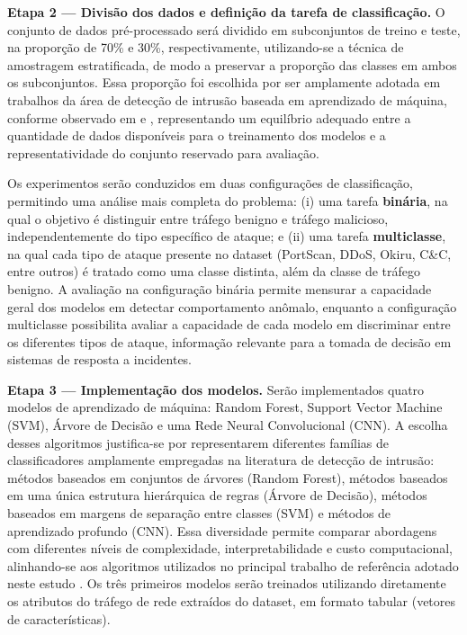 \textbf{Etapa 2 — Divisão dos dados e definição da tarefa de classificação.} O conjunto de dados pré-processado será dividido em subconjuntos de treino e teste, na proporção de 70\% e 30\%, respectivamente, utilizando-se a técnica de amostragem estratificada, de modo a preservar a proporção das classes em ambos os subconjuntos. Essa proporção foi escolhida por ser amplamente adotada em trabalhos da área de detecção de intrusão baseada em aprendizado de máquina, conforme observado em \cite{SouzaArima2024} e \cite{Bochie2020}, representando um equilíbrio adequado entre a quantidade de dados disponíveis para o treinamento dos modelos e a representatividade do conjunto reservado para avaliação.

Os experimentos serão conduzidos em duas configurações de classificação, permitindo uma análise mais completa do problema: (i) uma tarefa \textbf{binária}, na qual o objetivo é distinguir entre tráfego benigno e tráfego malicioso, independentemente do tipo específico de ataque; e (ii) uma tarefa \textbf{multiclasse}, na qual cada tipo de ataque presente no dataset (PortScan, DDoS, Okiru, C\&C, entre outros) é tratado como uma classe distinta, além da classe de tráfego benigno. A avaliação na configuração binária permite mensurar a capacidade geral dos modelos em detectar comportamento anômalo, enquanto a configuração multiclasse possibilita avaliar a capacidade de cada modelo em discriminar entre os diferentes tipos de ataque, informação relevante para a tomada de decisão em sistemas de resposta a incidentes.

\textbf{Etapa 3 — Implementação dos modelos.} Serão implementados quatro modelos de aprendizado de máquina: Random Forest, Support Vector Machine (SVM), Árvore de Decisão e uma Rede Neural Convolucional (CNN). A escolha desses algoritmos justifica-se por representarem diferentes famílias de classificadores amplamente empregadas na literatura de detecção de intrusão: métodos baseados em conjuntos de árvores (Random Forest), métodos baseados em uma única estrutura hierárquica de regras (Árvore de Decisão), métodos baseados em margens de separação entre classes (SVM) e métodos de aprendizado profundo (CNN). Essa diversidade permite comparar abordagens com diferentes níveis de complexidade, interpretabilidade e custo computacional, alinhando-se aos algoritmos utilizados no principal trabalho de referência adotado neste estudo \cite{SouzaArima2024}. Os três primeiros modelos serão treinados utilizando diretamente os atributos do tráfego de rede extraídos do dataset, em formato tabular (vetores de características).

